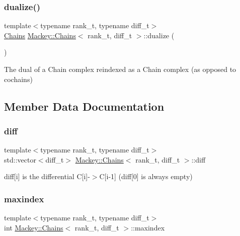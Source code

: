 \subsubsection{\texorpdfstring{dualize()}{dualize()}\hspace{0.1cm}{\footnotesize\ttfamily [2/2]}}
{\footnotesize\ttfamily template$<$typename rank\+\_\+t, typename diff\+\_\+t$>$ \\
\hyperlink{classMackey_1_1Chains}{Chains} \hyperlink{classMackey_1_1Chains}{Mackey\+::\+Chains}$<$ rank\+\_\+t, diff\+\_\+t $>$\+::dualize (\begin{DoxyParamCaption}{ }\end{DoxyParamCaption})\hspace{0.3cm}{\ttfamily [inline]}}



The dual of a Chain complex reindexed as a Chain complex (as opposed to cochains) 



\subsection{Member Data Documentation}
\mbox{\label{classMackey_1_1Chains_a9ccee2cbb3daa1e82bab920aeef59516}} 
\subsubsection{\texorpdfstring{diff}{diff}}
{\footnotesize\ttfamily template$<$typename rank\+\_\+t, typename diff\+\_\+t$>$ \\
std\+::vector$<$diff\+\_\+t$>$ \hyperlink{classMackey_1_1Chains}{Mackey\+::\+Chains}$<$ rank\+\_\+t, diff\+\_\+t $>$\+::diff}



diff\mbox{[}i\mbox{]} is the differential C\mbox{[}i\mbox{]}-\/$>$C\mbox{[}i-\/1\mbox{]} (diff\mbox{[}0\mbox{]} is always empty) 

\mbox{\label{classMackey_1_1Chains_a12a79cb031092cfd3473bb6512e7ae94}} 
\subsubsection{\texorpdfstring{maxindex}{maxindex}}
{\footnotesize\ttfamily template$<$typename rank\+\_\+t, typename diff\+\_\+t$>$ \\
int \hyperlink{classMackey_1_1Chains}{Mackey\+::\+Chains}$<$ rank\+\_\+t, diff\+\_\+t $>$\+::maxindex}



